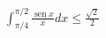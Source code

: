 \item $\displaystyle \int_{\pi/4}^{\pi/2} \frac{\operatorname{sen} x}{x} dx \le \frac{\sqrt{2}}{2}$
